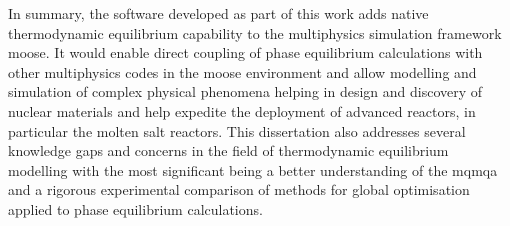 	In summary, the software developed as part of this work adds native thermodynamic equilibrium capability to the multiphysics simulation framework \gls{moose}. It would enable direct coupling of phase equilibrium calculations with other multiphysics codes in the \gls{moose} environment and allow modelling and simulation of complex physical phenomena helping in design and discovery of nuclear materials and help expedite the deployment of advanced reactors, in particular the molten salt reactors. This dissertation also addresses several knowledge gaps and concerns in the field of thermodynamic equilibrium modelling with the most significant being a better understanding of the \gls{mqmqa} and a rigorous experimental comparison of methods for global optimisation applied to phase equilibrium calculations.
	
	
	